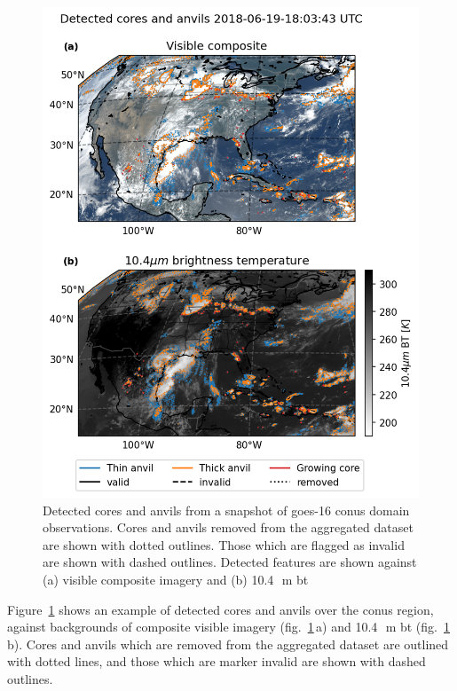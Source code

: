 \begin{figure}[tp]
    \centering
    \includegraphics[width=\textwidth]{figures/ch2_02.png}
    \caption[
    Detected cores and anvils from a snapshot of \acrshort{goes}-16 \acrshort{conus} domain observations
    ]{
    Detected cores and anvils from a snapshot of \acrshort{goes}-16 \acrshort{conus} domain observations. Cores and anvils removed from the aggregated dataset are shown with dotted outlines. Those which are flagged as invalid are shown with dashed outlines. Detected features are shown against (a) visible composite imagery and (b) 10.4\,\unit{\mu m} \acrshort{bt}
    }
    \label{fig:conus_detected_dccs}
\end{figure}

Figure~\ref{fig:conus_detected_dccs} shows an example of detected cores and anvils over the \acrshort{conus} region, against backgrounds of composite visible imagery (fig.~\ref{fig:conus_detected_dccs}\,a) and 10.4\,\unit{\mu m} \acrshort{bt} (fig.~\ref{fig:conus_detected_dccs}\,b).
Cores and anvils which are removed from the aggregated dataset are outlined with dotted lines, and those which are marker invalid are shown with dashed outlines.

